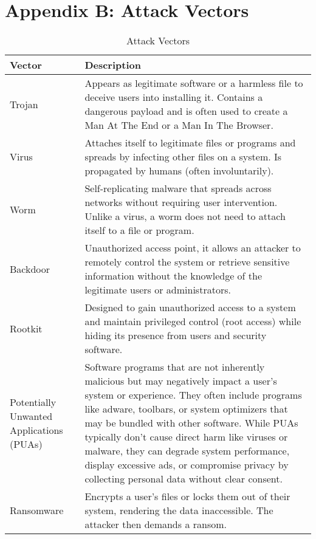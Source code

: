 \chapter{Appendix B: Attack Vectors}

\begin{table}[H]
    \centering
    \begin{tabular}{|p{3cm}|p{12cm}|}\hline
    \rowcolor{blue!10}
    \textbf{Vector} 
        & \textbf{Description}  
    \\ \hline

    Trojan
        & Appears as legitimate software or a harmless file to deceive users into installing it. Contains a dangerous payload and is often used to create a Man At The End or a Man In The Browser.
    \\ \hline
    
    Virus
        & Attaches itself to legitimate files or programs and spreads by infecting other files on a system. Is propagated by humans (often involuntarily).
    \\ \hline

    Worm
        & Self-replicating malware that spreads across networks without requiring user intervention. Unlike a virus, a worm does not need to attach itself to a file or program.
    \\ \hline

    Backdoor
        & Unauthorized access point, it allows an attacker to remotely control the system or retrieve sensitive information without the knowledge of the legitimate users or administrators.
    \\ \hline

    Rootkit
        & Designed to gain unauthorized access to a system and maintain privileged control (root access) while hiding its presence from users and security software.
    \\ \hline

    Potentially Unwanted Applications (PUAs)
        & Software programs that are not inherently malicious but may negatively impact a user’s system or experience. They often include programs like adware, toolbars, or system optimizers that may be bundled with other software. While PUAs typically don’t cause direct harm like viruses or malware, they can degrade system performance, display excessive ads, or compromise privacy by collecting personal data without clear consent. 
    \\ \hline

    Ransomware 
        & Encrypts a user’s files or locks them out of their system, rendering the data inaccessible. The attacker then demands a ransom.
    \\ \hline



\end{tabular}
\caption{Attack Vectors}
\label{tab:attackVectors}
\end{table}
